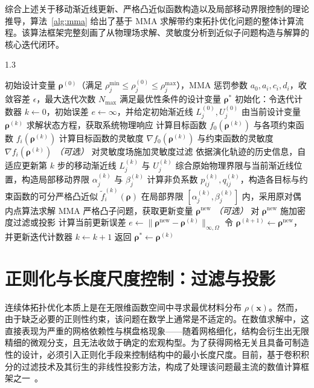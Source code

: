 综合上述关于移动渐近线更新、严格凸近似函数构造以及局部移动界限控制的理论推导，算法~\ref{alg:mma} 给出了基于 MMA 求解带约束拓扑优化问题的整体计算流程。该算法框架完整刻画了从物理场求解、灵敏度分析到近似子问题构造与解算的核心迭代闭环。
\begin{algorithm}[h]
	\caption{MMA 求解带约束的拓扑优化问题}
	\label{alg:mma}
	\begin{spacing}{1.3}
		\begin{algorithmic}[1]
			\Require 初始设计变量 $\boldsymbol{\rho}^{(0)}$（满足 $\rho_j^{\min} \leq \rho_j^{(0)} \leq \rho_j^{\max}$），MMA 惩罚参数 $a_0, a_i, c_i, d_i$，收敛容差 $\epsilon$，最大迭代次数 $N_{\max}$
			\Ensure 满足最优性条件的设计变量 $\boldsymbol{\rho}^*$
			\State 初始化：令迭代计数器 $k \gets 0$，初始误差 $e \gets \infty$，并给定初始渐近线 $L_j^{(0)}, U_j^{(0)}$
			\State 由当前设计变量 $\boldsymbol{\rho}^{(k)}$ 求解状态方程，获取系统物理响应
			\State 计算目标函数 $f_0(\boldsymbol{\rho}^{(k)})$ 与各项约束函数 $f_i(\boldsymbol{\rho}^{(k)})$
			\State 计算目标函数的灵敏度 $\nabla f_0(\boldsymbol{\rho}^{(k)})$ 与约束函数的灵敏度 $\nabla f_i(\boldsymbol{\rho}^{(k)})$
			\State \textit{（可选）} 对灵敏度场施加灵敏度过滤
			\State 依据演化轨迹的历史信息，自适应更新第 $k$ 步的移动渐近线 $L_j^{(k)}$ 与 $U_j^{(k)}$
			\State 综合原始物理界限与当前渐近线位置，构造局部移动界限 $\alpha_j^{(k)}$ 与 $\beta_j^{(k)}$
			\State 计算非负系数 $p_{ij}^{(k)}, q_{ij}^{(k)}$，构造各目标与约束函数的可分严格凸近似 $\tilde{f}_i^{(k)}(\boldsymbol{\rho})$
			\State 在局部界限 $[\alpha_j^{(k)}, \beta_j^{(k)}]$ 内，采用原对偶内点算法求解 MMA 严格凸子问题，获取更新变量 $\boldsymbol{\rho}^{\mathrm{new}}$
			\State \textit{（可选）} 对 $\boldsymbol{\rho}^{\mathrm{new}}$ 施加密度过滤或投影
			\State 计算当前更新误差 $e \gets \|\boldsymbol{\rho}^{\mathrm{new}} - \boldsymbol{\rho}^{(k)}\|_{\infty,\Omega}$
			\State 令 $\boldsymbol{\rho}^{(k+1)} \gets \boldsymbol{\rho}^{\mathrm{new}}$，并更新迭代计数器 $k \gets k + 1$
			\EndWhile
			\State 返回 $\boldsymbol{\rho}^* \gets \boldsymbol{\rho}^{(k)}$
		\end{algorithmic}
	\end{spacing}
\end{algorithm}


\section{正则化与长度尺度控制：过滤与投影}
\label{sec:regularization}

连续体拓扑优化本质上是在无限维函数空间中寻求最优材料分布 $\rho(\boldsymbol{x})$。然而，由于缺乏必要的正则性约束，该问题在数学上通常是不适定的。在数值求解中，这直接表现为严重的网格依赖性与棋盘格现象——随着网格细化，结构会衍生出无限精细的微观分支，且无法收敛于确定的宏观构型。为了获得网格无关且具备可制造性的设计，必须引入正则化手段来控制结构中的最小长度尺度。目前，基于卷积积分的过滤技术及其衍生的非线性投影方法，构成了处理该问题最主流的数值计算框架之一~\cite{sigmundMorphologybasedBlackWhite2007b}。 



